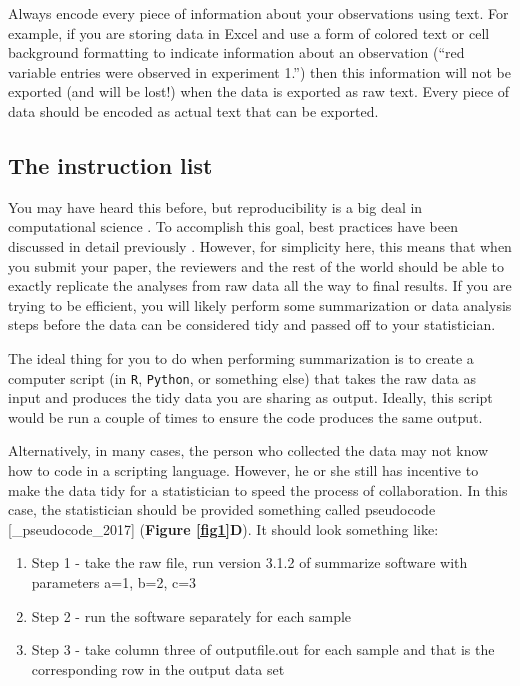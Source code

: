 \documentclass[12pt]{article}
\providecommand{\tightlist}{%
  \setlength{\itemsep}{0pt}\setlength{\parskip}{0pt}}
\begin{document}
Always encode every piece of information about your observations using
text. For example, if you are storing data in Excel and use a form of
colored text or cell background formatting to indicate information about
an observation (``red variable entries were observed in experiment 1.'')
then this information will not be exported (and will be lost!) when the
data is exported as raw text. Every piece of data should be encoded as
actual text that can be exported.

\subsection{The instruction list}\label{the-instruction-list}

You may have heard this before, but reproducibility is a big deal in
computational science \citep{peng_reproducible_2011}. To accomplish this
goal, best practices have been discussed in detail previously
\citep{wilson_good_2016}. However, for simplicity here, this means that
when you submit your paper, the reviewers and the rest of the world
should be able to exactly replicate the analyses from raw data all the
way to final results. If you are trying to be efficient, you will likely
perform some summarization or data analysis steps before the data can be
considered tidy and passed off to your statistician.

The ideal thing for you to do when performing summarization is to create
a computer script (in \texttt{R}, \texttt{Python}, or something else)
that takes the raw data as input and produces the tidy data you are
sharing as output. Ideally, this script would be run a couple of times
to ensure the code produces the same output.

Alternatively, in many cases, the person who collected the data may not
know how to code in a scripting language. However, he or she still has
incentive to make the data tidy for a statistician to speed the process
of collaboration. In this case, the statistician should be provided
something called pseudocode {[}\_pseudocode\_2017{]} (\textbf{Figure
\ref{fig1}D}). It should look something like:

\begin{enumerate}
\def\labelenumi{\arabic{enumi}.}
\tightlist
\item
  Step 1 - take the raw file, run version 3.1.2 of summarize software
  with parameters a=1, b=2, c=3
\item
  Step 2 - run the software separately for each sample
\item
  Step 3 - take column three of outputfile.out for each sample and that
  is the corresponding row in the output data set
\end{enumerate}
\end{document}
